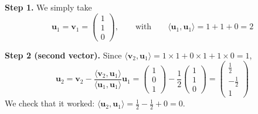 \documentclass[]{article}
\begin{document}
	\noindent \textbf{Step 1.} We simply take
	$$
	\mathbf{u}_1 = \mathbf{v}_1 = \begin{pmatrix} 1 \\ 1 \\ 0 \end{pmatrix},
	\qquad \text{with} \qquad
	\langle \mathbf{u}_1, \mathbf{u}_1 \rangle = 1 + 1 + 0 = 2
	$$

	\noindent \textbf{Step 2 (second vector).} Since $\langle \mathbf{v}_2, \mathbf{u}_1 \rangle = 1 \times 1 + 0 \times 1 + 1 \times 0 = 1$,
	$$
	\mathbf{u}_2 = \mathbf{v}_2 - \frac{\langle \mathbf{v}_2, \mathbf{u}_1 \rangle}{\langle \mathbf{u}_1, \mathbf{u}_1 \rangle} \mathbf{u}_1
	= \begin{pmatrix} 1 \\ 0 \\ 1 \end{pmatrix} - \frac{1}{2}\begin{pmatrix} 1 \\ 1 \\ 0 \end{pmatrix}
	= \begin{pmatrix} \frac{1}{2} \\ -\frac{1}{2} \\ 1 \end{pmatrix}
	$$
	We check that it worked: $\langle \mathbf{u}_2, \mathbf{u}_1 \rangle = \frac{1}{2} - \frac{1}{2} + 0 = 0$. \checkmark
\end{document}
